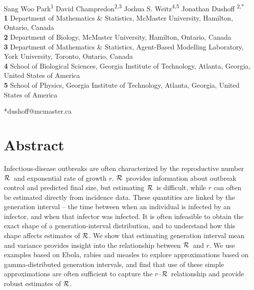 \documentclass[12pt]{article}
\newcommand{\rR}{\mbox{$r$--$\cal R$}}
\newcommand{\RR}{\ensuremath{{\cal R}}}
\begin{document}
\begin{flushleft}{
	\Large
	\textbf{}
}
\newline
\\
Sang Woo Park\textsuperscript{1}
David Champredon\textsuperscript{2,3}
Joshua S. Weitz\textsuperscript{4,5}
Jonathan Dushoff\textsuperscript{ 2,*}
\\

\bigskip
\textbf{1} Department of Mathematics \& Statistics, McMaster University, Hamilton, Ontario, Canada
\\
\textbf{2} Department of Biology, McMaster University, Hamilton, Ontario, Canada
\\
\textbf{3} Department of Mathematics \& Statistics, Agent-Based Modelling Laboratory, York University, Toronto, Ontario, Canada
\\
\textbf{4} School of Biological Sciences, Georgia Institute of Technology, Atlanta, Georgia, United States of America
\\
\textbf{5} School of Physics, Georgia Institute of Technology, Atlanta, Georgia, United States of America
\\
\bigskip

*dushoff@mcmaster.ca
\end{flushleft}

\section*{Abstract}

Infectious-disease outbreaks are often characterized by the reproductive number \RR\ and exponential rate of growth $r$.
\RR\ provides information about outbreak control and predicted final size, but
estimating \RR\ is difficult, while $r$ can often be estimated directly from incidence data.
These quantities are linked by the generation interval -- the time between when an individual is infected by an infector, and when that infector was infected.
It is often infeasible to obtain the exact shape of a generation-interval distribution,
and to understand how this shape affects estimates of \RR.
We show that estimating generation interval mean and variance provides insight into the relationship between \RR\ and $r$.
We use examples based on Ebola, rabies and measles to explore approximations based on gamma-distributed generation intervals, and find that use of these simple approximations are often sufficient to capture the \rR\ relationship and provide robust estimates of \RR.
\end{document}
